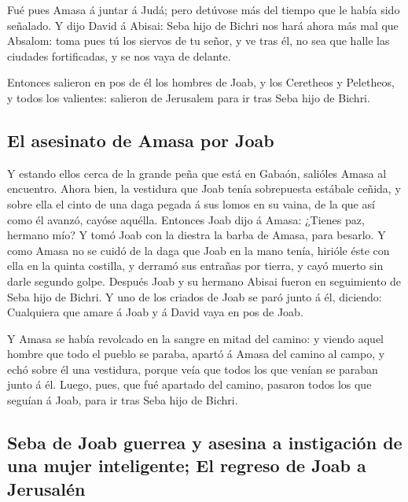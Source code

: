  Fué pues Amasa á juntar á Judá; pero detúvose más del
tiempo que le había sido señalado.  Y dijo David á Abisai:
Seba hijo de Bichri nos hará ahora más mal que Absalom: toma pues tú los
siervos de tu señor, y ve tras él, no sea que halle las ciudades
fortificadas, y se nos vaya de delante.

 Entonces salieron en pos de él los hombres de Joab, y los
Ceretheos y Peletheos, y todos los valientes: salieron de Jerusalem para
ir tras Seba hijo de Bichri.

\hypertarget{el-asesinato-de-amasa-por-joab}{%
\subsection{El asesinato de Amasa por
Joab}\label{el-asesinato-de-amasa-por-joab}}

 Y estando ellos cerca de la grande peña que está en
Gabaón, salióles Amasa al encuentro. Ahora bien, la vestidura que Joab
tenía sobrepuesta estábale ceñida, y sobre ella el cinto de una daga
pegada á sus lomos en su vaina, de la que así como él avanzó, cayóse
aquélla.  Entonces Joab dijo á Amasa: ¿Tienes paz, hermano
mío? Y tomó Joab con la diestra la barba de Amasa, para besarlo.
 Y como Amasa no se cuidó de la daga que Joab en la mano
tenía, hirióle éste con ella en la quinta costilla, y derramó sus
entrañas por tierra, y cayó muerto sin darle segundo golpe. Después Joab
y su hermano Abisai fueron en seguimiento de Seba hijo de Bichri.
 Y uno de los criados de Joab se paró junto á él,
diciendo: Cualquiera que amare á Joab y á David vaya en pos de Joab.

 Y Amasa se había revolcado en la sangre en mitad del
camino: y viendo aquel hombre que todo el pueblo se paraba, apartó á
Amasa del camino al campo, y echó sobre él una vestidura, porque veía
que todos los que venían se paraban junto á él.  Luego,
pues, que fué apartado del camino, pasaron todos los que seguían á Joab,
para ir tras Seba hijo de Bichri.

\hypertarget{seba-de-joab-guerrea-y-asesina-a-instigaciuxf3n-de-una-mujer-inteligente-el-regreso-de-joab-a-jerusaluxe9n}{%
\subsection{Seba de Joab guerrea y asesina a instigación de una mujer
inteligente; El regreso de Joab a
Jerusalén}\label{seba-de-joab-guerrea-y-asesina-a-instigaciuxf3n-de-una-mujer-inteligente-el-regreso-de-joab-a-jerusaluxe9n}}


